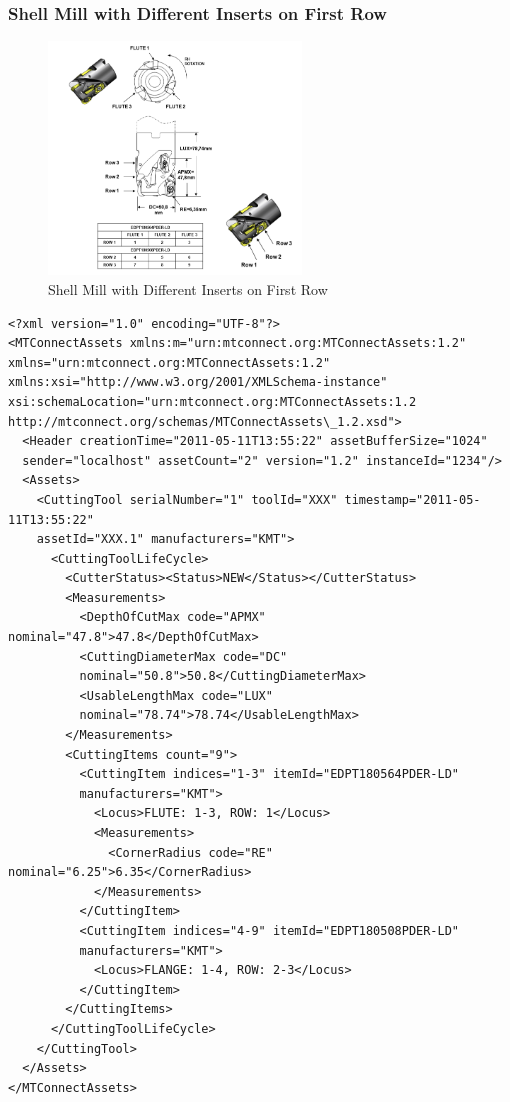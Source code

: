 \documentclass{mtconnect}	%
\begin{document}
\subsubsection{Shell Mill with Different Inserts on First Row}

\begin{figure}[ht]
  \centering
  \includegraphics[width=0.6\textwidth]{figures/a12-shell-mill-with-different-inserts-on-first-row.png}
  \caption{Shell Mill with Different Inserts on First Row}
  \label{fig:a12-shell-mill-with-different-inserts-on-first-row.png}
\end{figure}
\FloatBarrier

\begin{lstlisting}[firstnumber=1,escapechar=|,% 
caption={Example for Shell Mill with Different Inserts on First Row}, label={lst:shell-mill-with-different-inserts-on-first-row}]
<?xml version="1.0" encoding="UTF-8"?>
<MTConnectAssets xmlns:m="urn:mtconnect.org:MTConnectAssets:1.2" 
xmlns="urn:mtconnect.org:MTConnectAssets:1.2" 
xmlns:xsi="http://www.w3.org/2001/XMLSchema-instance" 
xsi:schemaLocation="urn:mtconnect.org:MTConnectAssets:1.2 
http://mtconnect.org/schemas/MTConnectAssets\_1.2.xsd">
  <Header creationTime="2011-05-11T13:55:22" assetBufferSize="1024" 
  sender="localhost" assetCount="2" version="1.2" instanceId="1234"/>
  <Assets>
    <CuttingTool serialNumber="1" toolId="XXX" timestamp="2011-05-11T13:55:22" 
    assetId="XXX.1" manufacturers="KMT">
      <CuttingToolLifeCycle>
        <CutterStatus><Status>NEW</Status></CutterStatus>
        <Measurements>
          <DepthOfCutMax code="APMX" nominal="47.8">47.8</DepthOfCutMax>
          <CuttingDiameterMax code="DC" 
          nominal="50.8">50.8</CuttingDiameterMax>
          <UsableLengthMax code="LUX" 
          nominal="78.74">78.74</UsableLengthMax>
        </Measurements>
        <CuttingItems count="9">
          <CuttingItem indices="1-3" itemId="EDPT180564PDER-LD" 
          manufacturers="KMT">
            <Locus>FLUTE: 1-3, ROW: 1</Locus>
            <Measurements>
              <CornerRadius code="RE" nominal="6.25">6.35</CornerRadius>
            </Measurements>
          </CuttingItem>
          <CuttingItem indices="4-9" itemId="EDPT180508PDER-LD" 
          manufacturers="KMT">
            <Locus>FLANGE: 1-4, ROW: 2-3</Locus>
          </CuttingItem>
        </CuttingItems>
      </CuttingToolLifeCycle>
    </CuttingTool>
  </Assets>
</MTConnectAssets>
\end{lstlisting}
\end{document}
